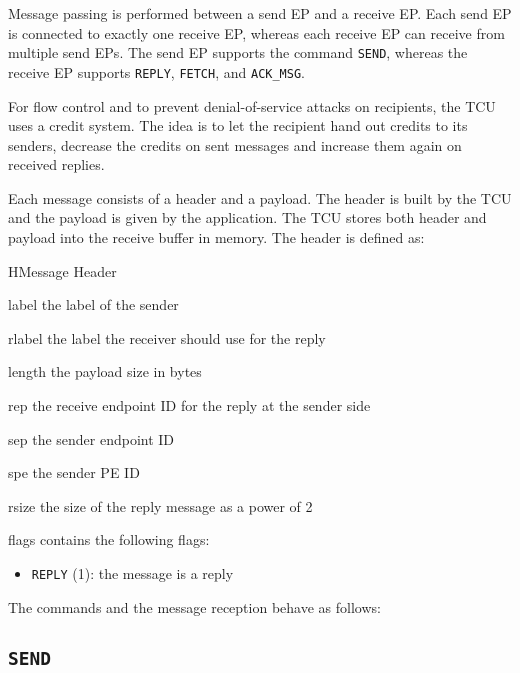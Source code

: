 Message passing is performed between a send EP and a receive EP. Each send EP is connected to
exactly one receive EP, whereas each receive EP can receive from multiple send EPs. The send EP
supports the command \texttt{SEND}, whereas the receive EP supports \texttt{REPLY}, \texttt{FETCH},
and \texttt{ACK\_MSG}.

For flow control and to prevent denial-of-service attacks on recipients, the TCU uses a credit
system. The idea is to let the recipient hand out credits to its senders, decrease the credits on
sent messages and increase them again on received replies.

Each message consists of a header and a payload. The header is built by the TCU and the payload is
given by the application. The TCU stores both header and payload into the receive buffer in memory.
The header is defined as:

\begin{register}{H}{Message Header}{}
  \regnewline%
  \regnewline%
  \begin{regdesc}\begin{reglist}
    \item[label] the label of the sender
    \item[rlabel] the label the receiver should use for the reply
    \item[length] the payload size in bytes
    \item[rep] the receive endpoint ID for the reply at the sender side
    \item[sep] the sender endpoint ID
    \item[spe] the sender PE ID
    \item[rsize] the size of the reply message as a power of 2
    \item[flags] contains the following flags:
    \begin{itemize}
      \item \texttt{REPLY} (1): the message is a reply
    \end{itemize}
  \end{reglist}\end{regdesc}
\end{register}

\noindent The commands and the message reception behave as follows:

\subsection{\texttt{SEND}}

